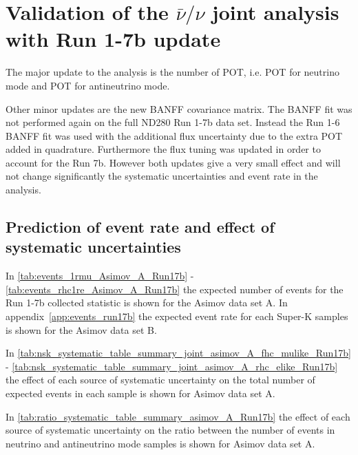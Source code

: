 \clearpage


\section{Validation of the $\bar{\nu}/\nu$ joint analysis with Run 1-7b update}
\label{sec:validation_run17b}

The major update to the analysis is the number of POT, 
i.e. 
\TotalPotNuRunOneSevenB{} POT for neutrino mode
and
\TotalPotNuBarRunOneSevenB{} POT for antineutrino mode. 

Other minor updates are the new BANFF covariance matrix.
The BANFF fit was not performed again on the full ND280 Run 1-7b data set. Instead the Run 1-6
BANFF fit was used with the additional flux uncertainty due to the extra POT added in quadrature. 
Furthermore the flux tuning was updated in order to account for the Run 7b.
However both updates give a very small effect and will not change significantly the systematic
uncertainties and event rate in the analysis.

%
%

\subsection{Prediction of event rate and effect of systematic uncertainties}
\label{sec:event_rate_syst_run17b}




In \cref{tab:events_1rmu_Asimov_A_Run17b} - \ref{tab:events_rhc1re_Asimov_A_Run17b} 
the expected number of events for the Run 1-7b collected statistic is shown for the Asimov data set A.
In appendix~\ref{app:events_run17b} the expected event rate for each Super-K samples is shown for the Asimov data set B.






\clearpage

In \cref{tab:nsk_systematic_table_summary_joint_asimov_A_fhc_mulike_Run17b} - 
\ref{tab:nsk_systematic_table_summary_joint_asimov_A_rhc_elike_Run17b}
the effect of each source of systematic uncertainty on the total number of expected events in each sample is shown
for Asimov data set A.

In \cref{tab:ratio_systematic_table_summary_asimov_A_Run17b} 
the effect of each source of systematic uncertainty on the ratio between the number of events in 
neutrino and antineutrino mode samples is shown for Asimov data set A.

